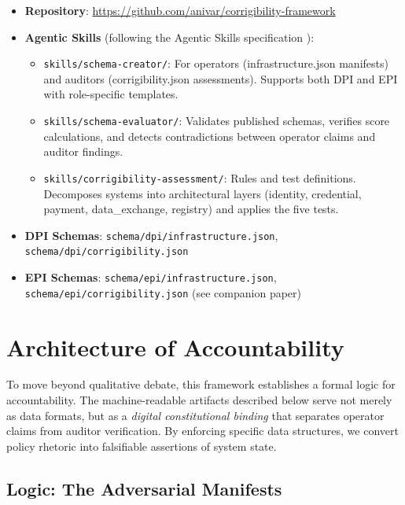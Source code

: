 \documentclass{article}
\begin{document}
\begin{itemize}
    \item \textbf{Repository}: \url{https://github.com/anivar/corrigibility-framework}
    \item \textbf{Agentic Skills} (following the Agentic Skills specification \citep{agentskills2025}):
    \begin{itemize}
        \item \texttt{skills/schema-creator/}: For operators (infrastructure.json manifests) and auditors (corrigibility.json assessments). Supports both DPI and EPI with role-specific templates.
        \item \texttt{skills/schema-evaluator/}: Validates published schemas, verifies score calculations, and detects contradictions between operator claims and auditor findings.
        \item \texttt{skills/corrigibility-assessment/}: Rules and test definitions. Decomposes systems into architectural layers (identity, credential, payment, data\_exchange, registry) and applies the five tests.
    \end{itemize}
    \item \textbf{DPI Schemas}: \texttt{schema/dpi/infrastructure.json}, \texttt{schema/dpi/corrigibility.json}
    \item \textbf{EPI Schemas}: \texttt{schema/epi/infrastructure.json}, \texttt{schema/epi/corrigibility.json} (see companion paper)
\end{itemize}

\appendix

\section{Architecture of Accountability}
\label{appendix:architecture}

To move beyond qualitative debate, this framework establishes a formal logic for accountability. The machine-readable artifacts described below serve not merely as data formats, but as a \textit{digital constitutional binding} that separates operator claims from auditor verification. By enforcing specific data structures, we convert policy rhetoric into falsifiable assertions of system state.

\subsection{Logic: The Adversarial Manifests}
\end{document}
